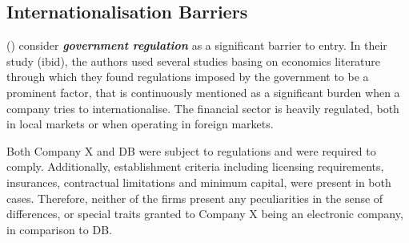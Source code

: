 \documentclass[11pt,a4paper]{article}
\begin{document}
{{{\subsection{Internationalisation Barriers}
\vspace{-1mm}
\label{int_barriers}
 \par



 \citeauthor{karakayaBarriersEntryMarket1989} (\citeyear{karakayaBarriersEntryMarket1989}) consider \textbf{\textit{government regulation}} as a significant barrier to entry. In their study (ibid), the authors used several studies basing on economics literature through which they found regulations imposed by the government to be a prominent factor, that is continuously mentioned as a significant burden when a company tries to internationalise.  The financial sector is heavily regulated, both in local markets or when operating in foreign markets.\par
Both Company X and DB were subject to regulations and were required to comply. Additionally, establishment criteria including licensing requirements, insurances, contractual limitations and minimum capital, were present in both cases. Therefore, neither of the firms present any peculiarities in the sense of differences, or special traits granted to Company X being an electronic company, in comparison to DB. \par

}}}
\end{document}
